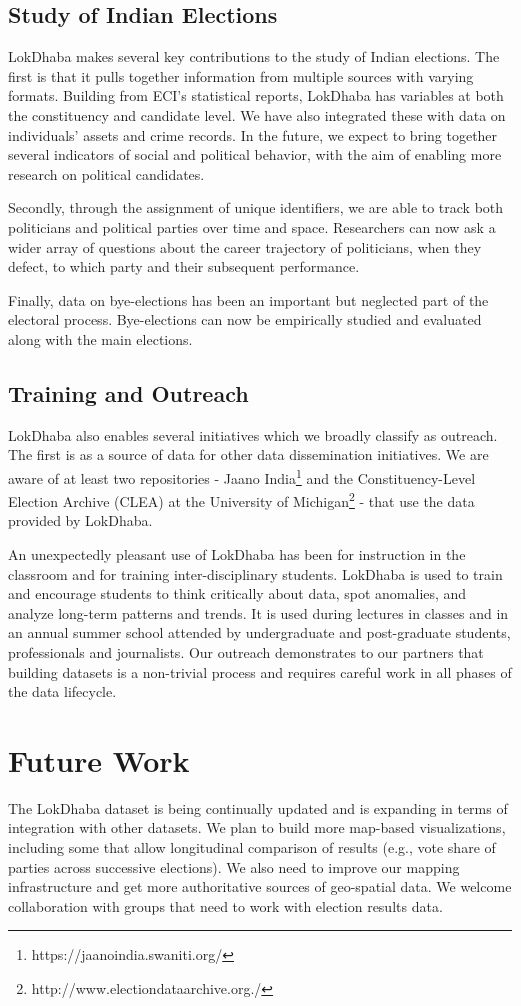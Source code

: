 \subsection{Study of Indian Elections}

LokDhaba makes several key contributions to the study of Indian elections. The first is that it pulls together information from multiple sources with varying formats. Building from ECI's statistical reports, LokDhaba has variables at both the constituency and candidate level. We have also integrated these with data on individuals' assets and crime records. In the future, we expect to bring together several indicators of social and political behavior, with the aim of enabling more research on political candidates.

Secondly, through the assignment of unique identifiers, we are able to track both politicians and political parties over time and space. Researchers can now ask a wider array of questions about the career trajectory of politicians, when they defect, to which party and their subsequent performance. 

Finally, data on bye-elections has been an important but neglected part of the electoral process. Bye-elections can now be empirically studied and evaluated along with the main elections.

\subsection{Training and Outreach}

LokDhaba also enables several initiatives which we broadly classify as outreach. The first is as a source of data for other data dissemination initiatives. We are aware of at least two repositories - Jaano India\footnote{https://jaanoindia.swaniti.org/} and the Constituency-Level Election Archive (CLEA) at the University of Michigan\footnote{http://www.electiondataarchive.org./} - that use the data provided by LokDhaba.

An unexpectedly pleasant use of LokDhaba has been for instruction in the classroom and for training inter-disciplinary students. LokDhaba is used to train and encourage students to think critically about data, spot anomalies, and analyze long-term patterns and trends. It is used during lectures in classes and in an annual summer school attended by undergraduate and post-graduate students, professionals and journalists. Our outreach demonstrates to our partners that building datasets is a non-trivial process and requires careful work in all phases of the data lifecycle.

\section{Future Work}

The LokDhaba dataset is being continually updated and is expanding in terms of integration with other datasets. We plan to build more map-based visualizations, including some that allow longitudinal comparison of results (e.g., vote share of parties across successive elections). We also need to improve our mapping infrastructure and get more authoritative sources of geo-spatial data. We welcome collaboration with groups that need to work with election results data.